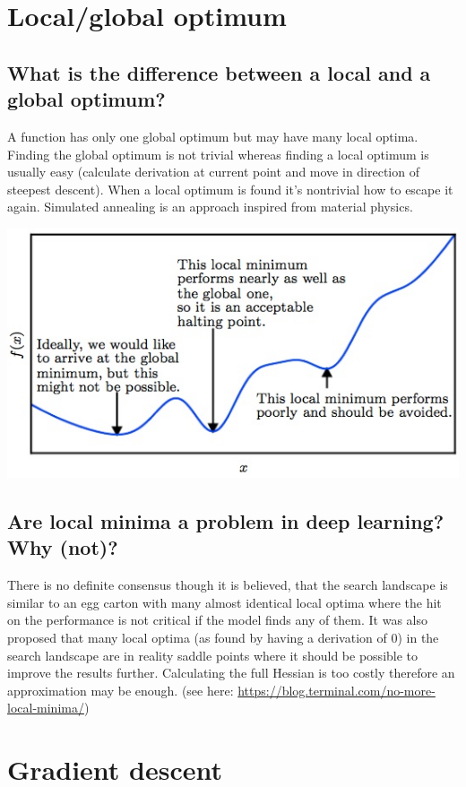 \section{Local/global optimum}
\subsection{What is the difference between a local and a global optimum?}
A function has only one global optimum but may have many local optima. Finding the global optimum is not trivial whereas finding a local optimum is usually easy (calculate derivation at current point and move in direction of steepest descent). When a local optimum is found it's nontrivial how to escape it again. Simulated annealing is an approach inspired from material physics.

\includegraphics[width=\textwidth]{./img/localOpt.jpeg}
\subsection{Are local minima a problem in deep learning?  Why (not)?}
There is no definite consensus though it is believed, that the search landscape is similar to an egg carton with many almost identical local optima where the hit on the performance is not critical if the model finds any of them. It was also proposed that many local optima (as found by having a derivation of 0) in the search landscape are in reality saddle points where it should be possible to improve the results further. Calculating the full Hessian is too costly therefore an approximation may be enough. (see here: \url{https://blog.terminal.com/no-more-local-minima/})
%
\section{Gradient descent}
